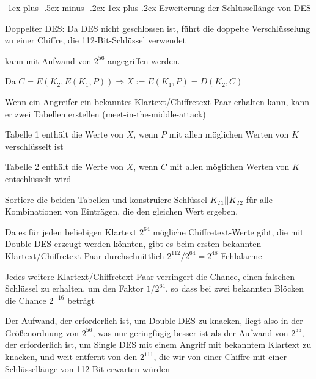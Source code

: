 \documentclass[a4paper]{article}
\makeatletter
\renewcommand{\subsubsection}{\@startsection{subsubsection}{3}{0mm}%
 {-1ex plus -.5ex minus -.2ex}%
 {1ex plus .2ex}%
 {\normalfont\small\bfseries}}
\makeatother
\begin{document}
\begin{multicols}{3}
      \subsubsection{Erweiterung der Schlüssellänge von DES}
      \begin{itemize*}
            \item Doppelter DES: Da DES nicht geschlossen ist, führt die doppelte Verschlüsselung zu einer Chiffre, die 112-Bit-Schlüssel verwendet
            \begin{itemize*}
                  \item kann mit Aufwand von $2^{56}$ angegriffen werden.
                  \item Da $C=E(K_2,E(K_1,P)) \Rightarrow X:=E(K_1,P)=D(K_2,C)$
                  \item Wenn ein Angreifer ein bekanntes Klartext/Chiffretext-Paar erhalten kann, kann er zwei Tabellen erstellen (meet-in-the-middle-attack)
                  \begin{itemize*}
                        \item Tabelle 1 enthält die Werte von $X$, wenn $P$ mit allen möglichen Werten von $K$ verschlüsselt ist
                        \item Tabelle 2 enthält die Werte von $X$, wenn $C$ mit allen möglichen Werten von $K$ entschlüsselt wird
                        \item Sortiere die beiden Tabellen und konstruiere Schlüssel $K_{T1}|| K_{T2}$ für alle Kombinationen von Einträgen, die den gleichen Wert ergeben.
                  \end{itemize*}
            \end{itemize*}
            \item Da es für jeden beliebigen Klartext $2^{64}$ mögliche Chiffretext-Werte gibt, die mit Double-DES erzeugt werden könnten, gibt es beim ersten bekannten Klartext/Chiffretext-Paar durchschnittlich $2^{112}/2^{64}=2^{48}$ Fehlalarme
            \item Jedes weitere Klartext/Chiffretext-Paar verringert die Chance, einen falschen Schlüssel zu erhalten, um den Faktor $1/2^{64}$, so dass bei zwei bekannten Blöcken die Chance $2^{-16}$ beträgt
            \item Der Aufwand, der erforderlich ist, um Double DES zu knacken, liegt also in der Größenordnung von $2^{56}$, was nur geringfügig besser ist als der Aufwand von $2^{55}$, der erforderlich ist, um Single DES mit einem Angriff mit bekanntem Klartext zu knacken, und weit entfernt von den $2^{111}$, die wir von einer Chiffre mit einer Schlüssellänge von 112 Bit erwarten würden

\end{itemize*}
\end{multicols}
\end{document}

